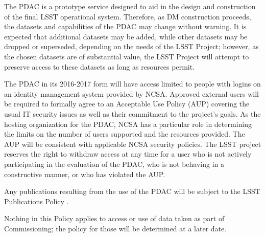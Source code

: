 \documentclass[DM,lsstdraft,toc]{lsstdoc}
\begin{document}
The PDAC is a prototype service designed to aid in the design and construction of the final LSST operational system. Therefore, as DM construction proceeds, the datasets and capabilities of the PDAC may change without warning. It is expected that additional datasets may be added, while other datasets may be dropped or superseded, depending on the needs of the LSST Project; however, as the chosen datasets are of substantial value, the LSST Project will attempt to preserve access to these datasets as long as resources permit.

The PDAC in its 2016-2017 form will have access limited to people with logins on an identity management system provided by NCSA. Approved external users will be required to formally agree to an Acceptable Use Policy (AUP) covering the usual IT security issues as well as their commitment to the project's goals. As the hosting organization for the PDAC, NCSA has a particular role in determining the limits on the number of users supported and the resources provided. The AUP will be consistent with applicable NCSA security policies. The LSST project reserves the right to withdraw access at any time for a user who is not actively participating in the evaluation of the PDAC, who is not behaving in a constructive manner, or who has violated the AUP.

Any publications resulting from the use of the PDAC will be subject to the LSST Publications Policy .

Nothing in this Policy applies to access or use of data taken as part of Commissioning; the policy for those will be determined at a later date.


\end{document}
